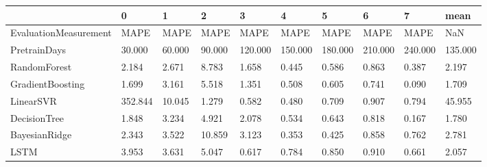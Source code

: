 \begin{tabular}{llllllllll}
\toprule
{} &       0 &      1 &      2 &       3 &       4 &       5 &       6 &       7 &    mean \\
\midrule
EvaluationMeasurement &    MAPE &   MAPE &   MAPE &    MAPE &    MAPE &    MAPE &    MAPE &    MAPE &     NaN \\
PretrainDays          &  30.000 & 60.000 & 90.000 & 120.000 & 150.000 & 180.000 & 210.000 & 240.000 & 135.000 \\
RandomForest          &   2.184 &  2.671 &  8.783 &   1.658 &   0.445 &   0.586 &   0.863 &   0.387 &   2.197 \\
GradientBoosting      &   1.699 &  3.161 &  5.518 &   1.351 &   0.508 &   0.605 &   0.741 &   0.090 &   1.709 \\
LinearSVR             & 352.844 & 10.045 &  1.279 &   0.582 &   0.480 &   0.709 &   0.907 &   0.794 &  45.955 \\
DecisionTree          &   1.848 &  3.234 &  4.921 &   2.078 &   0.534 &   0.643 &   0.818 &   0.167 &   1.780 \\
BayesianRidge         &   2.343 &  3.522 & 10.859 &   3.123 &   0.353 &   0.425 &   0.858 &   0.762 &   2.781 \\
LSTM                  &   3.953 &  3.631 &  5.047 &   0.617 &   0.784 &   0.850 &   0.910 &   0.661 &   2.057 \\
\bottomrule
\end{tabular}
